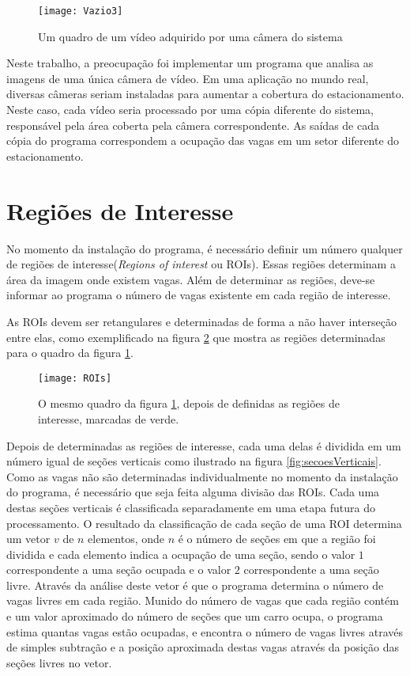 \begin{figure}[!ht]
	\centering
	\texttt{[image: Vazio3]}
	\label{fig:aquisicao}
	\caption{Um quadro de um vídeo adquirido por uma câmera do sistema}
	\centering
\end{figure}

Neste trabalho, a preocupação foi implementar um programa que analisa as imagens de uma única câmera de vídeo. Em uma aplicação no mundo real, diversas câmeras seriam instaladas para aumentar a cobertura do estacionamento. Neste caso, cada vídeo seria processado por uma cópia diferente do sistema, responsável pela área coberta pela câmera correspondente. As saídas de cada cópia do programa correspondem a ocupação das vagas em um setor diferente do estacionamento.

\section{Regiões de Interesse}\label{sec:ROIs}

No momento da instalação do programa, é necessário definir um número qualquer de regiões de interesse(\textit{Regions of interest} ou ROIs). Essas regiões determinam a área da imagem onde existem vagas. Além de determinar as regiões, deve-se informar ao programa o número de vagas existente em cada região de interesse.

As ROIs devem ser retangulares e determinadas de forma a não haver interseção entre elas, como exemplificado na figura \ref{fig:ROIs} que mostra as regiões determinadas para o quadro da figura \ref{fig:aquisicao}.

\begin{figure}
	\centering
	\texttt{[image: ROIs]}
	\label{fig:ROIs}
	\caption{O mesmo quadro da figura \ref{fig:aquisicao}, depois de definidas as regiões de interesse, marcadas de verde.}
	\centering
\end{figure}

Depois de determinadas as regiões de interesse, cada uma delas é dividida em um número igual de seções verticais como ilustrado na figura \ref{fig:secoesVerticais}. Como as vagas não são determinadas individualmente no momento da instalação do programa, é necessário que seja feita alguma divisão das ROIs. Cada uma destas seções verticais é classificada separadamente em uma etapa futura do processamento. O resultado da classificação de cada seção de uma ROI determina um vetor $v$ de $n$ elementos, onde $n$ é o número de seções em que a região foi dividida e cada elemento indica a ocupação de uma seção, sendo o valor $1$ correspondente a uma seção ocupada e o valor $2$ correspondente a uma seção livre. Através da análise deste vetor é que o programa determina o número de vagas livres em cada região. Munido do número de vagas que cada região contém e um valor aproximado do número de seções que um carro ocupa, o programa estima quantas vagas estão ocupadas, e encontra o número de vagas livres através de simples subtração e a posição aproximada destas vagas através da posição das seções livres no vetor.

